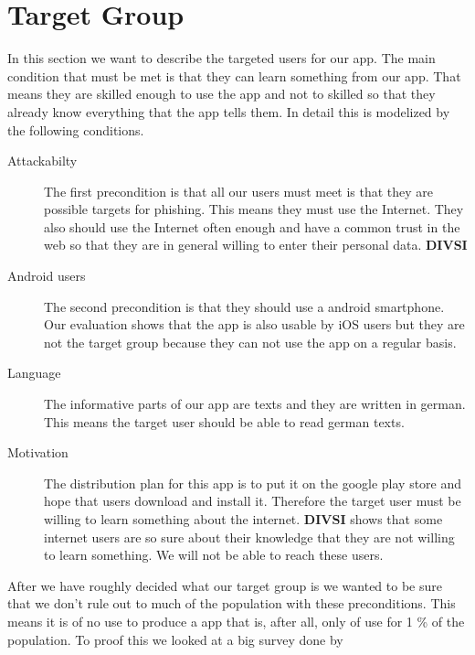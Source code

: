\section{Target Group}
\label{s:target_group}
In this section we want to describe the targeted users for our app.
The main condition that must be met is that they can learn something from our app.
That means they are skilled enough to use the app and not to skilled so that they already know everything that the app tells them.
In detail this is modelized by the following conditions.
\begin{description}
\item[Attackabilty] The first precondition is that all our users must meet is that they are possible targets for phishing.
This means they must use the Internet.
They also should use the Internet often enough and have a common trust in the web so that they are in general willing to enter their personal data.
\textbf{DIVSI}
\item[Android users] The second precondition is that they should use a android smartphone.
Our evaluation shows that the app is also usable by iOS users but they are not the target group because they can not use the app on a regular basis.
\item[Language] The informative parts of our app are texts and they are written in german.
This means the target user should be able to read german texts.
\item[Motivation] The distribution plan for this app is to put it on the google play store and hope that users download and install it.
Therefore the target user must be willing to learn something about the internet.
\textbf{DIVSI} shows that some internet users are so sure about their knowledge that they are not willing to learn something.
We will not be able to reach these users.
\end{description}

After we have roughly decided what our target group is we wanted to be sure that we don't rule out to much of the population with these preconditions.
This means it is of no use to produce a app that is, after all, only of use for 1 \% of the population.
To proof this we looked at a big survey done by 
